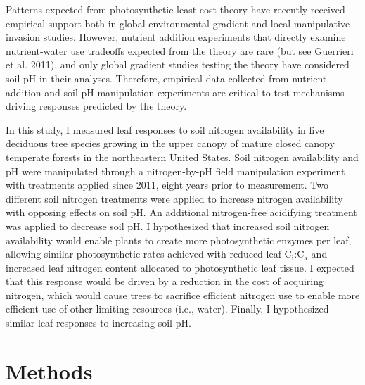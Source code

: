 Patterns expected from photosynthetic least-cost theory have recently received empirical support both in global environmental gradient  and local manipulative invasion  studies. However, nutrient addition experiments that directly examine nutrient-water use tradeoffs expected from the theory are rare (but see Guerrieri et al. 2011), and only global gradient studies testing the theory have considered soil pH in their analyses. Therefore, empirical data collected from nutrient addition and soil pH manipulation experiments are critical to test mechanisms driving responses predicted by the theory.

In this study, I measured leaf responses to soil nitrogen availability in five deciduous tree species growing in the upper canopy of mature closed canopy temperate forests in the northeastern United States. Soil nitrogen availability and pH were manipulated through a nitrogen-by-pH field manipulation experiment with treatments applied since 2011, eight years prior to measurement. Two different soil nitrogen treatments were applied to increase nitrogen availability with opposing effects on soil pH. An additional nitrogen-free acidifying treatment was applied to decrease soil pH. I hypothesized that increased soil nitrogen availability would enable plants to create more photosynthetic enzymes per leaf, allowing similar photosynthetic rates achieved with reduced leaf C$_\mathrm{i}$:C$_\mathrm{a}$ and increased leaf nitrogen content allocated to photosynthetic leaf tissue. I expected that this response would be driven by a reduction in the cost of acquiring nitrogen, which would cause trees to sacrifice efficient nitrogen use to enable more efficient use of other limiting resources (i.e., water). Finally, I hypothesized similar leaf responses to increasing soil pH.

\section{Methods}
